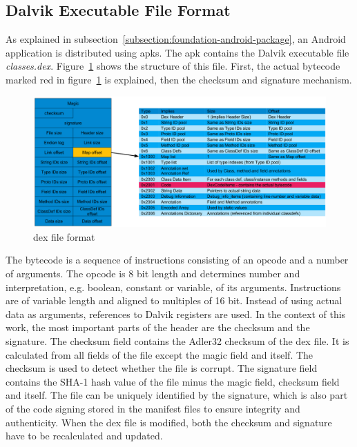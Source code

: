 \subsection{Dalvik Executable File Format} \label{subsection:android-dex}
As explained in subsection~\ref{subsection:foundation-android-package}, an Android application is distributed using \gls{apk}s.
The \gls{apk} contains the Dalvik executable file \textit{classes.dex}.
Figure~\ref{fig:dex} shows the structure of this file.
First, the actual bytecode marked red in figure~\ref{fig:dex} is explained, then the checksum and signature mechanism.
\newline
\begin{figure}[h]
    \centering
    \includegraphics[width=1\textwidth]{data/dex.png}
    \caption{\gls{dex} file format \cite{andevconDalvikART}}
    \label{fig:dex}
\end{figure}
The bytecode is a sequence of instructions consisting of an opcode and a number of arguments.
The opcode is 8 bit length and determines number and interpretation, e.g. boolean, constant or variable, of its arguments.
Instructions are of variable length and aligned to multiples of 16 bit.
Instead of using actual data as arguments, references to Dalvik registers are used. \cite{androidDalvik} \cite{opcodes}
\newline
In the context of this work, the most important parts of the header are the checksum and the signature.
The checksum field contains the Adler32 checksum of the \gls{dex} file.
It is calculated from all fields of the file except the magic field and itself.
The checksum is used to detect whether the file is corrupt.
The signature field contains the SHA-1 hash value of the file minus the magic field, checksum field and itself.
The file can be uniquely identified by the signature, which is also part of the code signing stored in the manifest files to ensure integrity and authenticity.
When the \gls{dex} file is modified, both the checksum and signature have to be recalculated and updated. \cite{developersDalvik} \cite{ehringerDalvik}
